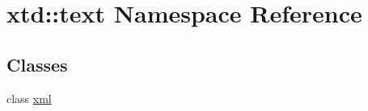 \hypertarget{namespacextd_1_1text}{\section{xtd\-:\-:text Namespace Reference}
\label{namespacextd_1_1text}
}
\subsection*{Classes}
\begin{DoxyCompactItemize}
\item 
class \hyperlink{classxtd_1_1text_1_1xml}{xml}
\end{DoxyCompactItemize}
